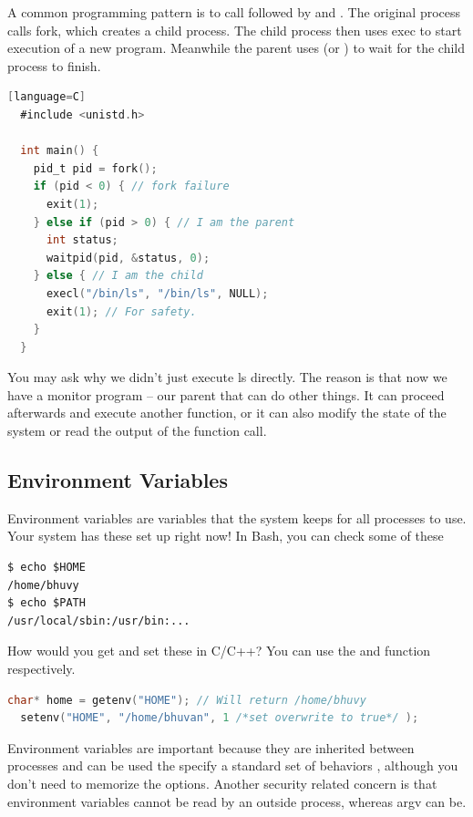 \begin{itemize}
A common programming pattern is to call  followed by  and .
The original process calls fork, which creates a child process.
The child process then uses exec to start execution of a new program.
Meanwhile the parent uses  (or ) to wait for the child process to finish.

\begin{lstlisting}[language=C][language=C]
  #include <unistd.h>

  int main() {
    pid_t pid = fork();
    if (pid < 0) { // fork failure
      exit(1);
    } else if (pid > 0) { // I am the parent
      int status;
      waitpid(pid, &status, 0);
    } else { // I am the child
      execl("/bin/ls", "/bin/ls", NULL);
      exit(1); // For safety.
    }
  }
\end{lstlisting}

You may ask why we didn't just execute ls directly.
The reason is that now we have a monitor program -- our parent that can do other things.
It can proceed afterwards and execute another function, or it can also modify the state of the system or read the output of the function call.

\subsection{Environment Variables}

Environment variables are variables that the system keeps for all processes to use.
Your system has these set up right now!
In Bash, you can check some of these

\begin{verbatim}
$ echo $HOME
/home/bhuvy
$ echo $PATH
/usr/local/sbin:/usr/bin:...
\end{verbatim}

How would you get and set these in C/C++? You can use the  and  function respectively.

\begin{lstlisting}[language=C]
  char* home = getenv("HOME"); // Will return /home/bhuvy
  setenv("HOME", "/home/bhuvan", 1 /*set overwrite to true*/ );
\end{lstlisting}

Environment variables are important because they are inherited between processes and can be used the specify a standard set of behaviors \cite{env_std_2018}, although you don't need to memorize the options.
Another security related concern is that environment variables cannot be read by an outside process, whereas argv can be.


\end{itemize}
